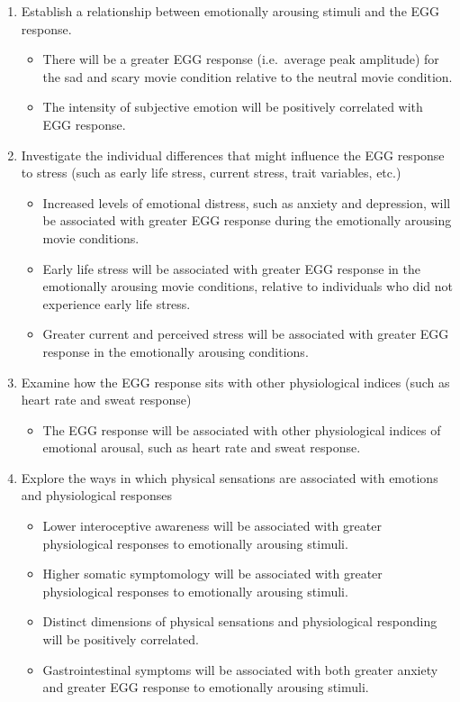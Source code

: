 \documentclass[]{book}
\providecommand{\tightlist}{%
  \setlength{\itemsep}{0pt}\setlength{\parskip}{0pt}}
\begin{document}
\begin{enumerate}
\def\labelenumi{\arabic{enumi}.}
\tightlist
\item
  Establish a relationship between emotionally arousing stimuli and the EGG response.

  \begin{itemize}
  \tightlist
  \item
    There will be a greater EGG response (i.e.~average peak amplitude) for the sad and scary movie condition relative to the neutral movie condition.
  \item
    The intensity of subjective emotion will be positively correlated with EGG response.
  \end{itemize}
\item
  Investigate the individual differences that might influence the EGG response to stress (such as early life stress, current stress, trait variables, etc.)

  \begin{itemize}
  \tightlist
  \item
    Increased levels of emotional distress, such as anxiety and depression, will be associated with greater EGG response during the emotionally arousing movie conditions.
  \item
    Early life stress will be associated with greater EGG response in the emotionally arousing movie conditions, relative to individuals who did not experience early life stress.
  \item
    Greater current and perceived stress will be associated with greater EGG response in the emotionally arousing conditions.
  \end{itemize}
\item
  Examine how the EGG response sits with other physiological indices (such as heart rate and sweat response)

  \begin{itemize}
  \tightlist
  \item
    The EGG response will be associated with other physiological indices of emotional arousal, such as heart rate and sweat response.
  \end{itemize}
\item
  Explore the ways in which physical sensations are associated with emotions and physiological responses

  \begin{itemize}
  \tightlist
  \item
    Lower interoceptive awareness will be associated with greater physiological responses to emotionally arousing stimuli.
  \item
    Higher somatic symptomology will be associated with greater physiological responses to emotionally arousing stimuli.
  \item
    Distinct dimensions of physical sensations and physiological responding will be positively correlated.
  \item
    Gastrointestinal symptoms will be associated with both greater anxiety and greater EGG response to emotionally arousing stimuli.
  \end{itemize}
\end{enumerate}
\end{document}
